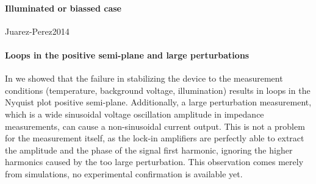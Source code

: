 	\paragraph{Illuminated or biassed case}
Juarez-Perez2014


	\paragraph{Loops in the positive semi-plane and large perturbations}\label{impedance-large_perturbations}
		In  we showed that the failure in stabilizing the device to the measurement conditions (temperature, background voltage, illumination) results in loops in the Nyquist plot positive semi-plane.
		Additionally, a large perturbation measurement, which is a wide sinusoidal voltage oscillation amplitude in impedance measurements, can cause a non-sinusoidal current output.
		This is not a problem for the measurement itself, as the lock-in amplifiers are perfectly able to extract the amplitude and the phase of the signal first harmonic, ignoring the higher harmonics caused by the too large perturbation.
		This observation comes merely from simulations, no experimental confirmation is available yet.

		\begin{figure}%
		\end{figure}


